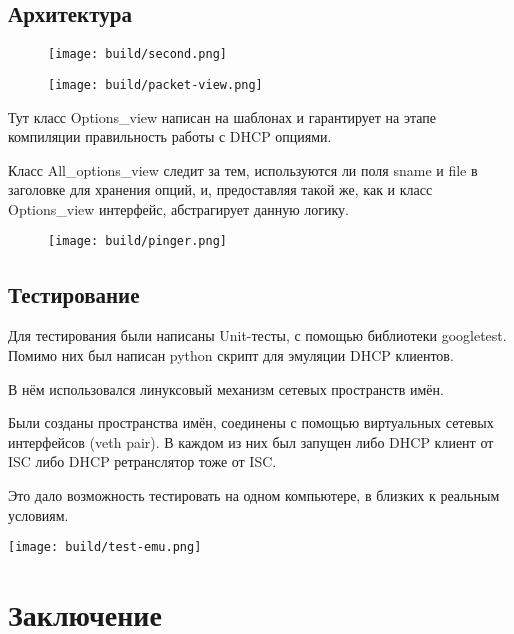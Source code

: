 \documentclass[12pt]{article}
\begin{document}
\subsection{Архитектура}

\begin{figure}[H]
    \texttt{[image: build/second.png]}
    \caption{}
\end{figure}

\begin{figure}[H]
    \texttt{[image: build/packet-view.png]}
    \caption{}
\end{figure}

Тут класс Options\_view написан на шаблонах и гарантирует на этапе компиляции правильность работы с DHCP опциями.

Класс All\_options\_view следит за тем, используются ли поля sname и file в заголовке для хранения опций, и, предоставляя такой же, как и класс Options\_view интерфейс, абстрагирует данную логику.

\begin{figure}[H]
    \texttt{[image: build/pinger.png]}
    \caption{}
\end{figure}

\pagebreak
\subsection{Тестирование}

Для тестирования были написаны Unit-тесты, с помощью библиотеки googletest.
Помимо них был написан python скрипт для эмуляции DHCP клиентов.

В нём использовался линуксовый механизм сетевых пространств имён.

Были созданы пространства имён, соединены с помощью виртуальных сетевых интерфейсов (veth pair). В каждом из них был запущен либо DHCP клиент от ISC либо DHCP ретранслятор тоже от ISC.

Это дало возможность тестировать на одном компьютере, в близких к реальным условиям.

\texttt{[image: build/test-emu.png]}

\pagebreak
\section{Заключение}
\end{document}
